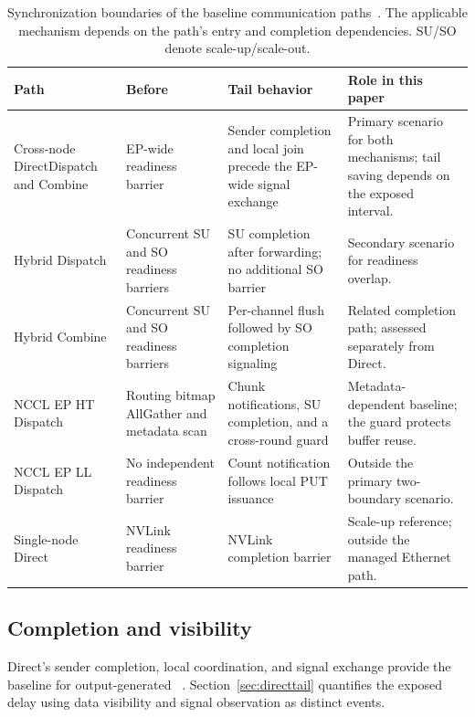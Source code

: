 \begin{table}[t]
\centering\small
\renewcommand{\arraystretch}{1.15}
\begin{tabularx}{\textwidth}{@{}>{\raggedright\arraybackslash}p{3.2cm}YYY@{}}
\toprule
Path & Before \data{} & Tail behavior & Role in this paper\\
\midrule
Cross-node Direct\newline Dispatch and Combine & EP-wide readiness barrier & Sender completion and local join precede the EP-wide signal exchange & Primary scenario for both mechanisms; tail saving depends on the exposed interval.\\
Hybrid Dispatch & Concurrent SU and SO readiness barriers & SU completion after forwarding; no additional SO barrier & Secondary scenario for readiness overlap.\\
Hybrid Combine & Concurrent SU and SO readiness barriers & Per-channel flush followed by SO completion signaling & Related completion path; assessed separately from Direct.\\
NCCL EP HT Dispatch & Routing bitmap AllGather and metadata scan & Chunk notifications, SU completion, and a cross-round guard & Metadata-dependent baseline; the guard protects buffer reuse.\\
NCCL EP LL Dispatch & No independent readiness barrier & Count notification follows local PUT issuance & Outside the primary two-boundary scenario.\\
Single-node Direct & NVLink readiness barrier & NVLink completion barrier & Scale-up reference; outside the managed Ethernet path.\\
\bottomrule
\end{tabularx}
\caption{Synchronization boundaries of the baseline communication paths~\cite{deepepcode,ncclhtcode,ncclllcode}. The applicable mechanism depends on the path's entry and completion dependencies. SU/SO denote scale-up/scale-out.}
\label{tab:paths}
\end{table}

\subsection{Completion and visibility}
\label{sec:tailaudit}
Direct's sender completion, local coordination, and signal exchange provide the baseline for output-generated \done{}~\cite{gdakicode}. Section~\ref{sec:directtail} quantifies the exposed delay using data visibility and signal observation as distinct events.

